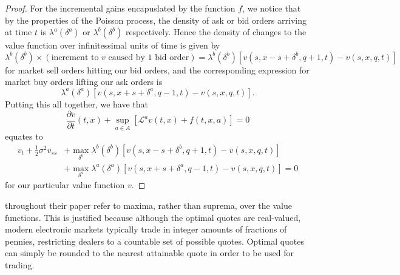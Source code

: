 \begin{proof}
    For the incremental gains encapuslated by the function $f$, we notice that 
    by the properties of the Poisson process, the density of ask or bid orders
    arriving at time $t$ is $\lambda^a(\delta^a)$ or $\lambda^b(\delta^b)$ respectively.
    Hence the density of changes to the value function over infinitessimal units of 
    time is given by 
    \begin{equation*}
        \lambda^b(\delta^b)\times(\textrm{increment to $v$ caused by 1 bid order})=\lambda^b(\delta^b)[v(s,x-s+\delta^b,q+1,t)-v(s,x,q,t)]
    \end{equation*}
    for market sell orders hitting our bid orders, and the corresponding expression 
    for market buy orders lifting our ask orders is 
    \begin{equation*}
        \lambda^a(\delta^a)[v(s,x+s+\delta^a,q-1,t)-v(s,x,q,t)].
    \end{equation*}
    Putting this all together, we have that 
    \begin{equation*}
        \frac{\partial v}{\partial t}(t,x)+\sup_{a\in A}\left[\mathcal{L}^av(t,x)+f(t,x,a)\right]=0
    \end{equation*}
    equates to 
    \begin{equation*}
            \begin{aligned}
                v_t+\frac{1}{2}\sigma^2v_{ss}&+\max\limits_{\delta^b}\lambda^b(\delta^b)[v(s,x-s+\delta^b,q+1,t)-v(s,x,q,t)]\\
                &+\max\limits_{\delta^a}\lambda^a(\delta^a)[v(s,x+s+\delta^a,q-1,t)-v(s,x,q,t)]=0
            \end{aligned}
    \end{equation*}
    for our particular value function $v$. 
\end{proof}

\begin{remark}
    \textcite{AS2008} throughout their paper refer to maxima, rather than suprema, over
    the value functions. This is justified because although the optimal quotes 
    are real-valued, modern electronic markets typically trade in integer amounts 
    of fractions of pennies, restricting dealers to a countable set of possible quotes.
    Optimal quotes can simply be rounded to the nearest attainable quote in order to 
    be used for trading.
\end{remark}

